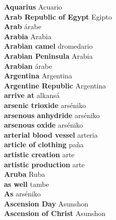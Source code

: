 \textbf{ Aquarius  } Acuario \\
\textbf{ Arab Republic of Egypt  } Egipto \\
\textbf{ Arab  } árabe \\
\textbf{ Arabia  } Arabia \\
\textbf{ Arabian camel  } dromedario \\
\textbf{ Arabian Peninsula  } Arabia \\
\textbf{ Arabian  } árabe \\
\textbf{ Argentina  } Argentina \\
\textbf{ Argentine Republic  } Argentina \\
\textbf{ arrive at  } alkansá \\
\textbf{ arsenic trioxide  } arséniko \\
\textbf{ arsenous anhydride  } arséniko \\
\textbf{ arsenous oxide  } arséniko \\
\textbf{ arterial blood vessel  } arteria \\
\textbf{ article of clothing  } paña \\
\textbf{ artistic creation  } arte \\
\textbf{ artistic production  } arte \\
\textbf{ Aruba  } Ruba \\
\textbf{ as well  } tambe \\
\textbf{ As  } arséniko \\
\textbf{ Ascension Day  } Asunshon \\
\textbf{ Ascension of Christ  } Asunshon \\
